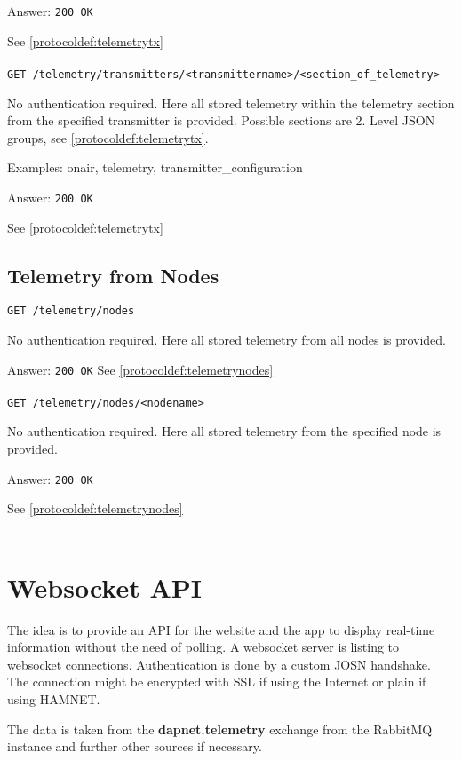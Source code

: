 Answer:
\texttt{200 OK}

See \ref{protocoldef:telemetrytx}\\\\

\texttt{GET /telemetry/transmitters/<transmittername>/<section\_of\_telemetry>}

No authentication required. Here all stored telemetry within the telemetry
section from the specified transmitter is provided. Possible sections are 2.
Level JSON groups, see \ref{protocoldef:telemetrytx}.

Examples: onair, telemetry, transmitter\_configuration

Answer:
\texttt{200 OK}

See \ref{protocoldef:telemetrytx}

\subsection{Telemetry from Nodes}

\texttt{GET /telemetry/nodes}

No authentication required. Here all stored telemetry from all nodes is provided.

Answer:
\texttt{200 OK}
See \ref{protocoldef:telemetrynodes}\\\\

\texttt{GET /telemetry/nodes/<nodename>}

No authentication required. Here all stored telemetry from the specified node is provided.

Answer:
\texttt{200 OK}

See \ref{protocoldef:telemetrynodes}\\\\


\section{Websocket API}
\label{protocoldef:websocketapi}
The idea is to provide an API for the website and the app to display real-time
information without the need of polling. A websocket server is listing to
websocket connections. Authentication is done by a custom JOSN handshake. The
connection might be encrypted with SSL if using the Internet or plain if using
HAMNET.

The data is taken from the \textbf{dapnet.telemetry} exchange
from the RabbitMQ instance and further other sources if necessary.

